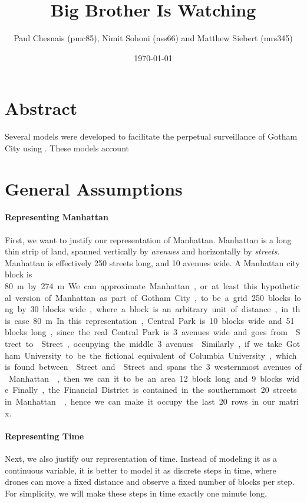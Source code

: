 \documentclass{article}
\title{Big Brother Is Watching}
\author{Paul Chesnais (pmc85), Nimit Sohoni (nss66) and Matthew Siebert (mrs345)}
\date{\today}
\begin{document}
\maketitle
\thispagestyle{empty}

\section{Abstract}
\label{sec:abstract}
Several models were developed to facilitate the perpetual surveillance of Gotham City using . These models account

\section{General Assumptions}
\label{sec:general_assumptions}
\paragraph{Representing Manhattan}
\label{par:representing_manhattan}
First, we want to justify our representation of Manhattan. Manhattan is a long thin strip of land, spanned vertically by \emph{avenues} and horizontally by \emph{streets}. Manhattan is effectively 250 streets long, and 10 avenues wide. A Manhattan city block is \SI{80}\m by \SI{274}\m. We can approximate Manhattan, or at least this hypothetical version of Manhattan as part of Gotham City, to be a grid 250 blocks long by 30 blocks wide, where a block is an arbitrary unit of distance, in this case \SI{80}\m. In this representation, Central Park is 10 blocks wide and 51 blocks long, since the real Central Park is 3 avenues wide and goes from  Street to  Street, occupying the middle 3 avenues \cite{centralpark}. Similarly, if we take Gotham University to be the fictional equivalent of Columbia University, which is found between  Street and  Street and spans the 3 westernmost avenues of Manhattan \cite{columbia}, then we can it to be an area 12 block long and 9 blocks wide. Finally, the Financial District is contained in the southernmost 20 streets in Manhattan \cite{financial}, hence we can make it occupy the last 20 rows in our matrix.

\paragraph{Representing Time}
\label{par:representing_time}
Next, we also justify our representation of time. Instead of modeling it as a continuous variable, it is better to model it as discrete steps in time, where drones can move a fixed distance and observe a fixed number of blocks per step. For simplicity, we will make these steps in time exactly one minute long.
\end{document}
